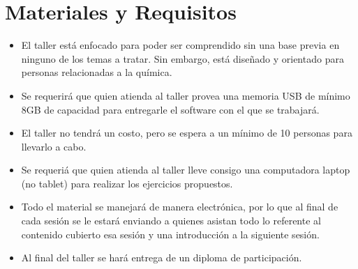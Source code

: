 \documentclass[10pt,letterpaper]{article}
\begin{document}
\section{Materiales y Requisitos}
\begin{itemize}
\item El taller est\'a enfocado para poder ser comprendido sin una base previa en ninguno de los temas a tratar. Sin embargo, est\'a dise\~nado y orientado para personas relacionadas a la qu\'imica.
\item Se requerir\'a que quien atienda al taller provea una memoria USB de m\'inimo 8GB de capacidad para entregarle el software con el que se trabajar\'a.
\item El taller no tendr\'a un costo, pero se espera a un m\'inimo de 10 personas para llevarlo a cabo.
\item Se requeri\'a que quien atienda al taller lleve consigo una computadora laptop (no tablet) para realizar los ejercicios propuestos.
\item Todo el material se manejar\'a de manera electr\'onica, por lo que al final de cada sesi\'on se le estar\'a enviando a quienes asistan todo lo referente al contenido cubierto esa sesi\'on y una introducci\'on a la siguiente sesi\'on.
\item Al final del taller se har\'a entrega de un diploma de participaci\'on.
\end{itemize}
\end{document}
